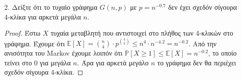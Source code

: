 \documentclass[a4paper, oneside, 11pt]{article}
\newtheorem{lm}[thm]{Λήμμα}
\theoremstyle{definition}
\newcommand{\pr}{\mathbb{P}}
\newcommand{\ex}{\mathbb{E}}
\begin{document}
\begin{enumerate}
\begin{proof}
      \begin{lm}
         \label{lm1.3}
         Αν $X \sim B(n, p)$ τότε $\ex[X] = np$.
      \end{lm}
      \begin{proof}
         \begin{align*}
            \ex[X] &= \sum_{i=0}^{n} i \cdot \pr[X = i]\\
                   &= \sum_{i=0}^{n} i {n \choose i} p^i (1-p)^{n-i}\\
                   &= \sum_{i=1}^{n} np {n-1 \choose i-1} p^{i-1}
                      (1-p)^{(n-1) - (i-1)}\\
                   &= np \sum_{i=0}^{n-1} {n-1 \choose i} p^{i}
                      (1-p)^{(n-1) - i}\\
                   &= np \cdot (p + (1-p))^{n-1} = np\\
         \end{align*}
      \end{proof}

      Για το γράφημα $G(n, p)$ έχουμε
      ότι ο βαθμός μιας κορυφής $v_i$ είναι μια τυχαία μεταβλητή $d_i$ που ακολουθεί
      την κατανομή Bernoulli με παραμέτρους $n-1, p$, δηλαδή $d_i \sim B(n-1,
      p)$.

      Για τον μέσο βαθμό κορυφής ισχύει:

      \[ d(G) = \frac{\sum_{i=1}^{n} d_i}{n} \]

      όπου $X = \sum_{i=1}^{n} d_i$.
      
      Σύμφωνα με το Λήμμα \ref{lm1.2} έχουμε ότι $X \sim B \left(\sum_{i=1}^{n}
      (n-1), p \right) = B( n(n-1), p)$.

      Από το Λήμμα \ref{lm1.3}, $\ex[X] = n(n-1)p$. Άρα έχουμε ότι:

      \[ \ex[d(G)] = \frac1n \ex[X] = (n-1)p \]
   \end{proof}

\item[2.]
   Δείξτε ότι το τυχαίο γράφημα $G(n, p)$ με $p = n^{-0.7}$ δεν έχει σχεδόν
   σίγουρα 4-κλίκα για αρκετά μεγάλα $n$.

   \begin{proof}
Έστω $X$ τυχαία μεταβλητή που αντιστοιχεί στο πλήθος των 4-κλικών στο γράφημα. Έχουμε ότι $\ex[X] = {n \choose 4} \cdot p^{4 \choose 2} \leq n^4 \cdot n^{-4.2} = n^{-0.2}$. Από την ανισότητα του Markov
έχουμε λοιπόν ότι $\pr[X\geq 1] \leq \ex[X] = n^{-0.2}$, το οποίο τείνει στο 0 για μεγάλα $n$. Άρα για αρκετά μεγάλο $n$ το γράφημα δεν θα περιέχει σχεδόν σίγουρα 4-κλίκα.
   \end{proof}


\end{enumerate}
\end{document}
